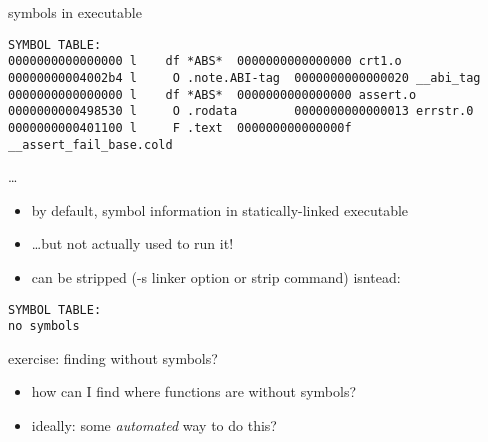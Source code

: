 \begin{frame}[fragile]{symbols in executable}
\begin{Verbatim}[fontsize=\small]
SYMBOL TABLE:
0000000000000000 l    df *ABS*  0000000000000000 crt1.o
00000000004002b4 l     O .note.ABI-tag  0000000000000020 __abi_tag
0000000000000000 l    df *ABS*  0000000000000000 assert.o
0000000000498530 l     O .rodata        0000000000000013 errstr.0
0000000000401100 l     F .text  000000000000000f __assert_fail_base.cold
\end{Verbatim}
\ldots
\begin{itemize}
\item by default, symbol information in statically-linked executable
\item \ldots but not actually used to run it!
\vspace{.5cm}
\item can be stripped (-s linker option or strip command) isntead:
\end{itemize}
\begin{Verbatim}[fontsize=\small]
SYMBOL TABLE:
no symbols
\end{Verbatim}
\end{frame}

\begin{frame}{exercise: finding without symbols?}
\begin{itemize}
\item how can I find where functions are without symbols?
\item ideally: some \textit{automated} way to do this?
\end{itemize}
\end{frame}

